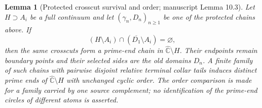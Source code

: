 \documentclass[11pt,reqno]{amsart}
\newtheorem{lemma}[theorem]{Lemma}
\theoremstyle{definition}
\theoremstyle{remark}
\newcommand{\Chat}{\widehat{\mathbb C}}
\begin{document}
\begin{lemma}[Protected crosscut survival and order; manuscript
Lemma 10.3]\label{lem:crosscut-survival}
Let $H\supset A_i$ be a full continuum and let $(\gamma_n,D_n)_{n\ge1}$ be
one of the protected chains above.  If
\[
(H\setminus A_i)\cap(\overline{D_1}\setminus A_i)=\varnothing,
\]
then the same crosscuts form a prime-end chain in
$\Chat\setminus H$.  Their endpoints remain boundary points and their
selected sides are the old domains $D_n$.  A finite family of such chains with
pairwise disjoint relative terminal collar tails induces distinct prime
ends of $\Chat\setminus H$ with unchanged cyclic order.  The order
comparison is made for a family carried by one source complement; no
identification of the prime-end circles of different atoms is asserted.
\end{lemma}
\end{document}
